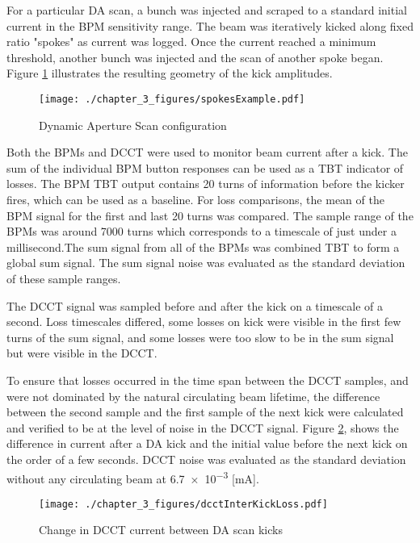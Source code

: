 For a particular DA scan, a bunch was injected and scraped to a standard initial current in the BPM sensitivity range. The beam was iteratively kicked along fixed ratio "spokes" as current was logged. Once the current reached a minimum threshold, another bunch was injected and the scan of another spoke began.  Figure \ref{fig:spokes} illustrates the resulting geometry of the kick amplitudes.

\begin{figure}
	\centering
	\texttt{[image: ./chapter\_3\_figures/spokesExample.pdf]}
	\caption{Dynamic Aperture Scan configuration}
	\label{fig:spokes}
\end{figure}

Both the BPMs and DCCT were used to monitor beam current after a kick. The sum of the individual BPM button responses can be used as a TBT indicator of losses. The BPM TBT output contains 20 turns of information before the kicker fires, which can be used as a baseline. For loss comparisons, the mean of the BPM signal for the first and last 20 turns was compared. The sample range of the BPMs was around 7000 turns which corresponds to a timescale of just under a millisecond.The sum signal from all of the BPMs was combined TBT to form a global sum signal. The sum signal noise was evaluated as the standard deviation of these sample ranges. 

The DCCT signal was sampled before and after the kick on a timescale of a second. Loss timescales differed, some losses on kick were visible in the first few turns of the sum signal, and some losses were too slow to be in the sum signal but were visible in the DCCT. 

To ensure that losses occurred in the time span between the DCCT samples, and were not dominated by the natural circulating beam lifetime, the difference between the second sample and the first sample of the next kick were calculated and verified to be at the level of noise in the DCCT signal. Figure \ref{fig:dcctKickLife}, shows the difference in current after a DA kick and the initial value before the next kick on the order of a few seconds. DCCT noise was evaluated as the standard deviation without any circulating beam at \num{6.7e-3} [mA].

\begin{figure}
	\centering
	\texttt{[image: ./chapter\_3\_figures/dcctInterKickLoss.pdf]}
	\caption{Change in DCCT current between DA scan kicks}
	\label{fig:dcctKickLife}
\end{figure}

